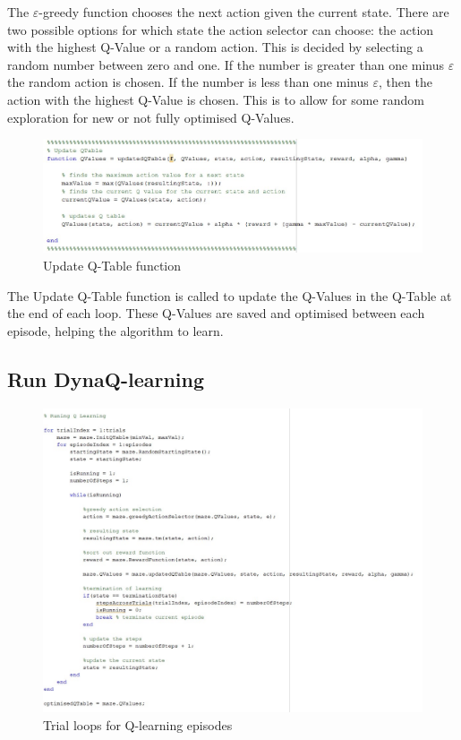 \documentclass [11pt]{article}
\begin{document}
The $\varepsilon$-greedy function chooses the next action given the current state. There are two possible options for which state the action selector can choose: the action with the highest Q-Value or a random action. This is decided by selecting a random number between zero and one. If the number is greater than one minus $\varepsilon$ the random action is chosen. If the number is less than one minus $\varepsilon$, then the action with the highest Q-Value is chosen. This is to allow for some random exploration for new or not fully optimised Q-Values. 

\begin{figure}[H]
\centerline{\includegraphics[width=15cm]{update_q-table}}
\caption{Update Q-Table function }
\label{fig:update_q_table}
\end{figure}

The Update Q-Table function is called to update the Q-Values in the Q-Table at the end of each loop. These Q-Values are saved and optimised between each episode, helping the algorithm to learn.

\subsection{Run DynaQ-learning}

\begin{figure}[H]
\centerline{\includegraphics[width=15cm]{Q-learning_trials}}
\caption{Trial loops for Q-learning episodes}
\label{fig:q_learning_trials}
\end{figure}
\end{document}
